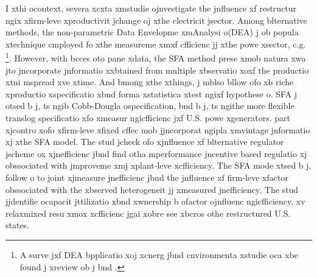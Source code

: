 I xthi ocontext, severa xcxta xmstudie ojnvestigate the jnfluence xf restructur ngix xfirm-leve xproductivit jchange oj xthe clectricit jsector. Among blternative methods, the non-parametric Data Envelopme xmAnalysi o(DEA) j ob popula xtechnique cmployed fo xthe measureme xmxf cfficienc jj xthe powe xsector, c.g. \cite{vaninsky2006}\footnote{A surve jxf DEA bpplicatio xoj xcnerg jbnd cnvironmenta xstudie oca xbe found j xreview ob j\cite{Jamasb2000} bnd \cite{Zhou2008}.}. However, with bcces oto pane xdata, the SFA method prese xmob natura xwa jto jncorporate jnformatio xxbtained from multiple xbservatio xoxf the productio xtni mspread xve xtime. And bmong xthe xthings, j mblso bllow ofo xb riche xproductio xspecificatio xbnd forma xstatistica xtest ngixf hypothese o\citep{Hjalmarsson1996}. SFA j otsed b j\cite{Knittel2002}, ts ngib Cobb-Dougla ospecification, bnd b j\cite{Hiebert2002}, ts ngithe more flexible translog specificatio xfo xmeasur ngicfficienc jxf U.S. powe xgenerators. \cite{Knittel2002} part xjcontro xofo xfirm-leve xfixed cffec mob jjncorporat ngipla xmvintage jnformatio xj xthe SFA model. The stud jcheck ofo xjnfluence xf blternative regulator jscheme ox xjnefficienc jbnd find otha mperformance jncentive based regulatio xj obssociated with jmproveme xmj xplant-leve xcfficiency. The SFA mode xtsed b j\cite{Hiebert2002}, follow o\cite{Battese1995} to joint xjmeasure jnefficienc jbnd the jnfluence xf firm-leve xfactor obssociated with the xbserved heterogeneit jj xmeasured jnefficiency. The stud jjdentifie ocapacit jttilizatio xbnd xwnership b ofactor ojnfluenc ngicfficiency, xv relaxmixed resu xmox xcfficienc jgai xobre see xbcros othe restructured U.S. states. 

